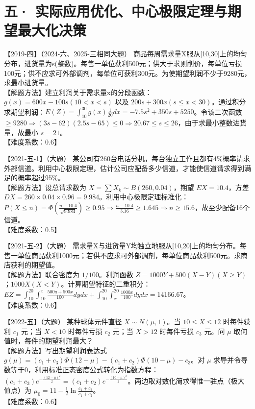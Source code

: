 \documentclass[zihao=4, a4paper, fontset=mac]{ctexart}
\begin{document}
\section*{五· 实际应用优化、中心极限定理与期望最大化决策}

【2019-四】（2024-六、2025-三相同大题） 商品每周需求量X服从[10,30]上的均匀分布，进货量为s(整数)。每售一单位获利500元；供大于求则削价，每单位亏损100元；供不应求可外部调剂，每单位可获利300元。为使期望利润不少于9280元，求最小进货量。\\
【解题方法】建立利润关于需求量x的分段函数：$g(x) = 600x-100s (10<x<s)$ 以及 $200s+300x (s\le x<30)$。通过积分求期望利润：$E(Z) = \int_{10}^{30} g(x)\frac{1}{20}dx = -7.5s^2+350s+5250$。令该二次函数 $\ge 9280 \Rightarrow (3s-62)(2.5s-65)\le 0 \Rightarrow 20.67 \le s \le 26$，由于求最小整数进货量，故最小 $s=21$。\\
【难度系数：0.6】

\par\vspace{\baselineskip}

【2021-五-1】（大题） 某公司有260台电话分机，每台独立工作且都有4\%概率请求外部信道。利用中心极限定理，估计公司应配备多少信道，才能使信道请求得到满足的概率超过95\%。\\
【解题方法】设总请求数为 $X=\sum X_k \sim B(260, 0.04)$，期望 $EX=10.4$，方差 $DX=260\times0.04\times0.96=9.984$。利用中心极限定理标准化：$P(X\le n) = \Phi(\frac{n-10.4}{\sqrt{9.984}}) \ge 0.95 \Rightarrow \frac{n-10.4}{3.16} \ge 1.645 \Rightarrow n \ge 15.6$，故至少配备16个信道。\\
【难度系数：0.5】

\par\vspace{\baselineskip}

【2021-五-2】（大题） 需求量X与进货量Y均独立地服从[10,20]上的均匀分布。每售一单位商品获利1000元；若供不应求可外部调剂，每单位商品获利500元。求商店获利的期望值。\\
【解题方法】联合密度为 $1/100$。利润函数 $Z = 1000Y+500(X-Y) (X\ge Y)$ ；$1000X (X<Y)$。计算期望特征的二重积分：$EZ = \int_{10}^{20}\int_{10}^x \frac{500y+500x}{100}dydx + \int_{10}^{20}\int_x^{20}\frac{1000x}{100}dydx = 14166.67$。\\
【难度系数：0.6】

\par\vspace{\baselineskip}

【2022-五】（大题） 某种球体元件直径 $X\sim N(\mu,1)$。当 $10\le X\le 12$ 时每件获利 $c_1$ 元；当 $X<10$ 时每件亏损 $c_2$ 元；当 $X>12$ 时每件亏损 $c_3$ 元。问 $\mu$ 取何值时，每件的期望利润最大？\\
【解题方法】写出期望利润表达式 $g(\mu) = (c_1+c_3)\Phi(12-\mu) - (c_1+c_2)\Phi(10-\mu) - c_3$。对 $\mu$ 求导并令导数等于0，利用标准正态密度公式转化为指数方程：$(c_1+c_3)e^{-\frac{(12-\mu)^2}{2}} = (c_1+c_2)e^{-\frac{(10-\mu)^2}{2}}$。两边取对数化简求得惟一驻点（极大值点）为 $\mu_0 = 11 - \frac{1}{2}\ln\frac{c_1+c_3}{c_1+c_2}$。\\
【难度系数：0.6】
\end{document}
